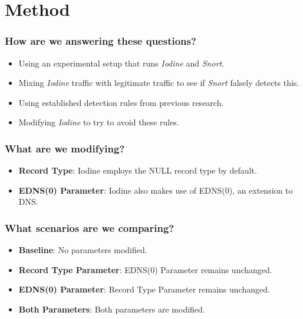 \documentclass{beamer}
\begin{document}

\section{Method}

\begin{frame}
\frametitle{How are we answering these questions?}

\begin{itemize}
    \item<1-> Using an experimental setup that runs \textit{Iodine} and \textit{Snort}.
    \item<2-> Mixing \textit{Iodine} traffic with legitimate traffic to see if \textit{Snort} falsely detects this.
    \item<3-> Using established detection rules from previous research.
    \item<4-> Modifying \textit{Iodine} to try to avoid these rules.
\end{itemize}
\end{frame}


\begin{frame}
\frametitle{What are we modifying?}

\begin{itemize}
    \item<1-> \textbf{Record Type}: Iodine employs the NULL record type by default.
    \item<2-> \textbf{EDNS(0) Parameter}: Iodine also makes use of EDNS(0), an extension to DNS.
\end{itemize}
\end{frame}


\begin{frame}
\frametitle{What scenarios are we comparing?}

\begin{itemize}
    \item<1-> \textbf{Baseline}: No parameters modified.
    \item<2-> \textbf{Record Type Parameter}: EDNS(0) Parameter remains unchanged.
    \item<3-> \textbf{EDNS(0) Parameter}: Record Type Parameter remains unchanged.
    \item<4-> \textbf{Both Parameters}: Both parameters are modified.
\end{itemize}
\end{frame}
\end{document}
